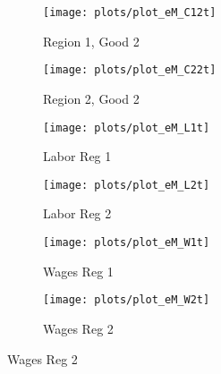 \documentclass[../thesis.tex]{subfiles}
\begin{document}
\begin{figure}[h!]
	\centering
	
	
	\begin{subfigure}[b]{0.25\textwidth}
		\centering
		\texttt{[image: plots/plot\_eM\_C12t]}
		\caption{\footnotesize Region 1, Good 2}
		\label{fig:ZMt-C12t}
	\end{subfigure}
	\hfill
	\begin{subfigure}[b]{0.25\textwidth}
		\centering
		\texttt{[image: plots/plot\_eM\_C22t]}
		\caption{\footnotesize Region 2, Good 2}
		\label{fig:ZMt-C22t}
	\end{subfigure}
	\hfill
	\begin{subfigure}[b]{0.25\textwidth}
		\centering
		\texttt{[image: plots/plot\_eM\_L1t]}
		\caption{\footnotesize Labor Reg 1}
		\label{fig:ZMt-L1t}
	\end{subfigure}
	\hfill		
	\vspace*{0.5cm}
	
	
	\begin{subfigure}[b]{0.25\textwidth}
		\centering
		\texttt{[image: plots/plot\_eM\_L2t]}
		\caption{\footnotesize Labor Reg 2}
		\label{fig:ZMt-L2t}
	\end{subfigure}
	\hfill
	\begin{subfigure}[b]{0.25\textwidth}
		\centering
		\texttt{[image: plots/plot\_eM\_W1t]}
		\caption{\footnotesize Wages Reg 1}
		\label{fig:ZMt-W1t}
	\end{subfigure}
	\hfill
	\begin{subfigure}[b]{0.25\textwidth}
		\centering
		\texttt{[image: plots/plot\_eM\_W2t]}
		\caption{\footnotesize Wages Reg 2}
		\label{fig:ZMt-W2t}
	\end{subfigure}
	\hfill
	\vspace*{0.5cm}
	
	

\end{figure}
\end{document}
